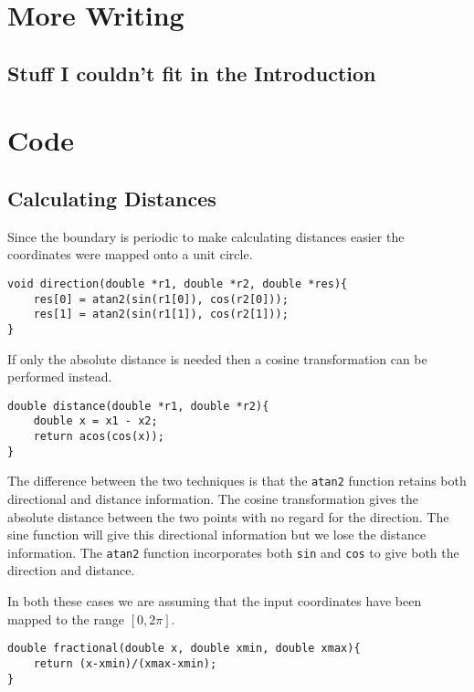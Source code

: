 \backmatter

\chapter{More Writing}

\section{Stuff I couldn't fit in the Introduction}

\chapter{Code}

\section{Calculating Distances}
\label{sec:calc distances}

Since the boundary is periodic to make calculating distances easier the coordinates were mapped onto a unit circle. 

\begin{lstlisting}[language=myc]
void direction(double *r1, double *r2, double *res){
    res[0] = atan2(sin(r1[0]), cos(r2[0]));
    res[1] = atan2(sin(r1[1]), cos(r2[1]));
}
\end{lstlisting}

If only the absolute distance is needed then a cosine transformation can be performed instead.

\begin{lstlisting}[language=myc]
double distance(double *r1, double *r2){
    double x = x1 - x2;
    return acos(cos(x));
}
\end{lstlisting}

The difference between the two techniques is that the \lstinline$atan2$ function retains both directional and distance information. The cosine transformation gives the absolute distance between the two points with no regard for the direction. The sine function will give this directional information but we lose the distance information. The \lstinline$atan2$ function incorporates both \lstinline$sin$ and \lstinline$cos$ to give both the direction and distance.

In both these cases we are assuming that the input coordinates have been mapped to the range $[0,2\pi]$.

\begin{lstlisting}[language=myc]
double fractional(double x, double xmin, double xmax){
    return (x-xmin)/(xmax-xmin);
}

\end{lstlisting}

